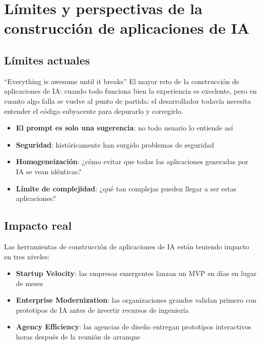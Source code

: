 \section{Límites y perspectivas de la construcción de aplicaciones de IA}

\subsection{Límites actuales}

\begin{warningbox}{``Everything is awesome until it breaks''}
El mayor reto de la construcción de aplicaciones de IA: cuando todo funciona bien la experiencia es excelente, pero en cuanto algo falla se vuelve al punto de partida: el desarrollador todavía necesita entender el código subyacente para depurarlo y corregirlo.
\end{warningbox}

\begin{itemize}
    \item \textbf{El prompt es solo una sugerencia}: no todo usuario lo entiende así
    \item \textbf{Seguridad}: históricamente han surgido problemas de seguridad
    \item \textbf{Homogeneización}: ¿cómo evitar que todas las aplicaciones generadas por IA se vean idénticas?
    \item \textbf{Límite de complejidad}: ¿qué tan complejas pueden llegar a ser estas aplicaciones?
\end{itemize}

\subsection{Impacto real}

Las herramientas de construcción de aplicaciones de IA están teniendo impacto en tres niveles:

\begin{itemize}
    \item \textbf{Startup Velocity}: las empresas emergentes lanzan un MVP en días en lugar de meses
    \item \textbf{Enterprise Modernization}: las organizaciones grandes validan primero con prototipos de IA antes de invertir recursos de ingeniería
    \item \textbf{Agency Efficiency}: las agencias de diseño entregan prototipos interactivos horas después de la reunión de arranque
\end{itemize}

